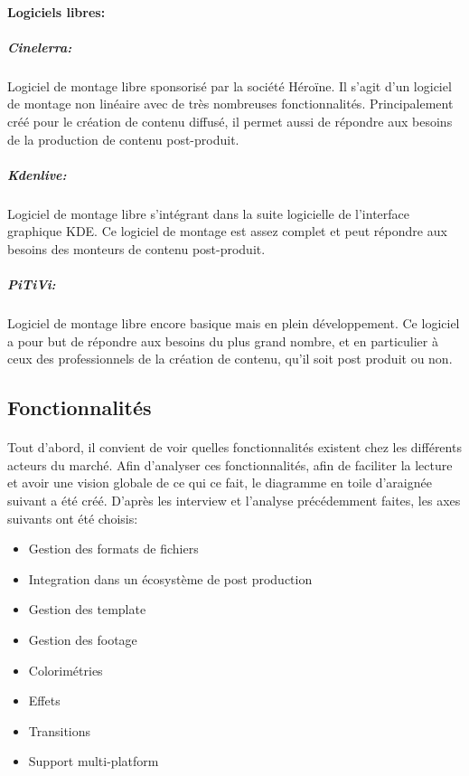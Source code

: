 \paragraph {Logiciels libres:}

\subparagraph{Cinelerra:}

Logiciel de montage libre sponsorisé par la société Héroïne. Il
s'agit d'un logiciel de montage non linéaire avec de très nombreuses
fonctionnalités. Principalement créé pour le création de contenu
diffusé, il permet aussi de répondre aux besoins de la production de
contenu post-produit.

\subparagraph{Kdenlive:}

Logiciel de montage libre s'intégrant dans la suite logicielle de
l'interface graphique KDE.  Ce logiciel de montage est assez complet et
peut répondre aux besoins des monteurs de contenu post-produit.

\subparagraph{PiTiVi:}

Logiciel de montage libre encore basique mais en plein développement.
Ce logiciel a pour but de répondre aux besoins du plus grand nombre,
et en particulier à ceux des professionnels de la création de contenu,
qu'il soit post produit ou non.


\subsection{Fonctionnalités}

\paragraph{}

Tout d'abord, il convient de voir quelles fonctionnalités
existent chez les différents acteurs du marché. Afin d'analyser ces
fonctionnalités, afin de faciliter la lecture et avoir une vision
globale de ce qui ce fait, le diagramme en toile d'araignée suivant
a été créé.  D'après les interview et l'analyse précédemment
faites, les axes suivants ont été choisis:
\begin{itemize} \setlength{\itemsep}{2mm}
  \item{Gestion des formats de fichiers} \item{Integration dans
  un écosystème de post production} \item{Gestion des template}
  \item{Gestion des footage} \item{Colorimétries} \item{Effets}
  \item{Transitions} \item{Support multi-platform}
\end {itemize}

